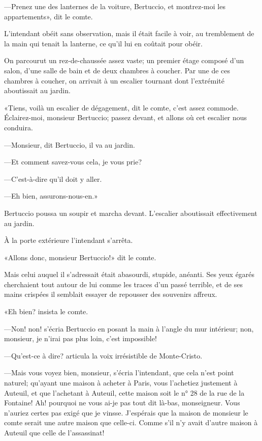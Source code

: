—Prenez une des lanternes de la voiture, Bertuccio, et montrez-moi les appartements», dit le comte. 

L'intendant obéit sans observation, mais il était facile à voir, au tremblement de la main qui tenait la lanterne, ce qu'il lui en coûtait pour obéir. 

On parcourut un rez-de-chaussée assez vaste; un premier étage composé d'un salon, d'une salle de bain et de deux chambres à coucher. Par une de ces chambres à coucher, on arrivait à un escalier tournant dont l'extrémité aboutissait au jardin. 

«Tiens, voilà un escalier de dégagement, dit le comte, c'est assez commode. Éclairez-moi, monsieur Bertuccio; passez devant, et allons où cet escalier nous conduira. 

—Monsieur, dit Bertuccio, il va au jardin. 

—Et comment savez-vous cela, je vous prie?  

—C'est-à-dire qu'il doit y aller. 

—Eh bien, assurons-nous-en.» 

Bertuccio poussa un soupir et marcha devant. L'escalier aboutissait effectivement au jardin. 

À la porte extérieure l'intendant s'arrêta. 

«Allons donc, monsieur Bertuccio!» dit le comte. 

Mais celui auquel il s'adressait était abasourdi, stupide, anéanti. Ses yeux égarés cherchaient tout autour de lui comme les traces d'un passé terrible, et de ses mains crispées il semblait essayer de repousser des souvenirs affreux. 

«Eh bien? insista le comte. 

—Non! non! s'écria Bertuccio en posant la main à l'angle du mur intérieur; non, monsieur, je n'irai pas plus loin, c'est impossible! 

—Qu'est-ce à dire? articula la voix irrésistible de Monte-Cristo. 

—Mais vous voyez bien, monsieur, s'écria l'intendant, que cela n'est point naturel; qu'ayant une maison à acheter à Paris, vous l'achetiez justement à Auteuil, et que l'achetant à Auteuil, cette maison soit le n° 28 de la rue de la Fontaine! Ah! pourquoi ne vous ai-je pas tout dit là-bas, monseigneur. Vous n'auriez certes pas exigé que je vinsse. J'espérais que la maison de monsieur le comte serait une autre maison que celle-ci. Comme s'il n'y avait d'autre maison à Auteuil que celle de l'assassinat! 


